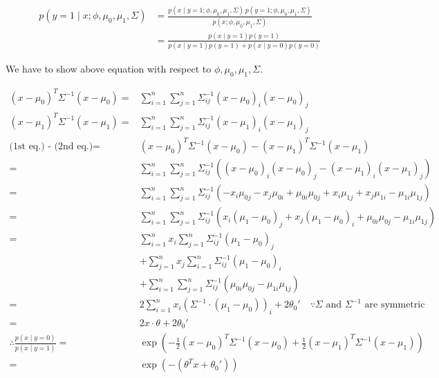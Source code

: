 \begin{answer}
\begin{align*}
    p(y=1\mid x;\phi,\mu_{0},\mu_{1},\Sigma) &= 
    \frac{p(x\mid y=1;\phi,\mu_{0},\mu_{1},\Sigma)\,p(y=1;\phi,\mu_{0},\mu_{1},\Sigma)}
    {p(x;\phi,\mu_{0},\mu_{1},\Sigma)} \\
    &= \frac{p(x\mid y=1)p(y=1)}
    {p(x\mid y=1)p(y=1) + p(x\mid y=0)p(y=0)}
\end{align*}

We have to show above equation with respect to $\phi,\mu_{0},\mu_{1},\Sigma$.

\begin{align*}
    (x-\mu_{0})^T \Sigma^{-1} (x-\mu_{0}) =& \sum_{i=1}^n\sum_{j=1}^n \Sigma^{-1}_{ij}(x-\mu_{0})_i (x-\mu_{0})_j \\
    (x-\mu_{1})^T \Sigma^{-1} (x-\mu_{1}) =& \sum_{i=1}^n\sum_{j=1}^n \Sigma^{-1}_{ij}(x-\mu_{1})_i (x-\mu_{1})_j \\
    \textrm{(1st eq.) - (2nd eq.)}
    =& (x-\mu_{0})^T \Sigma^{-1} (x-\mu_{0}) - (x-\mu_{1})^T \Sigma^{-1} (x-\mu_{1}) \\ 
    =& \sum_{i=1}^n\sum_{j=1}^n \Sigma^{-1}_{ij}\left((x-\mu_{0})_i (x-\mu_{0})_j - (x-\mu_{1})_i (x-\mu_{1})_j\right)\\
    =& \sum_{i=1}^n\sum_{j=1}^n \Sigma^{-1}_{ij}\left(- x_{i}\mu_{0j} - x_{j}\mu_{0i} + \mu_{0i}\mu_{0j} + x_{i}\mu_{1j} + x_{j}\mu_{1i} - \mu_{1i}\mu_{1j}\right) \\
    =& \sum_{i=1}^n\sum_{j=1}^n \Sigma^{-1}_{ij}\left(x_{i}(\mu_{1}-\mu_{0})_{j} + x_{j}(\mu_{1}-\mu_{0})_{i} + \mu_{0i}\mu_{0j} - \mu_{1i}\mu_{1j}\right)\\
    =& \sum_{i=1}^n x_{i}\sum_{j=1}^n \Sigma^{-1}_{ij}(\mu_{1}-\mu_{0})_{j} \\
    &+ \sum_{j=1}^n x_{j}\sum_{i=1}^n \Sigma^{-1}_{ij} (\mu_{1}-\mu_{0})_{i} \\
    &+ \sum_{i=1}^n \sum_{j=1}^n \Sigma^{-1}_{ij} (\mu_{0i}\mu_{0j} - \mu_{1i}\mu_{1j}) \\
    =& 2\sum_{i=1}^n x_{i} (\Sigma^{-1} \cdot (\mu_{1} - \mu_{0}))_{i} + 2\theta_{0}' \quad \because \Sigma\textrm{ and }\Sigma^{-1}\textrm{ are symmetric} \\
    =& 2x\cdot \theta + 2\theta_{0}' \\
    \therefore \frac{p(x\mid y=0)}{p(x\mid y=1)} =& \exp\left(-\frac{1}{2}(x-\mu_{0})^T \Sigma^{-1} (x-\mu_{0}) + \frac{1}{2}(x-\mu_{1})^T \Sigma^{-1} (x-\mu_{1})\right) \\
    =& \exp\left(-(\theta^T x + \theta_{0}')\right)
\end{align*}


\end{answer}
